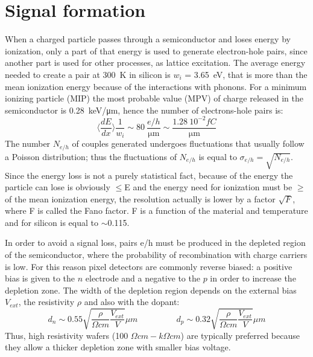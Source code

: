 \section{Signal formation}
   When a charged particle passes through a semiconductor and loses energy by ionization, only a part of that energy is used to generate electron-hole pairs, since another part is used for other processes, as lattice excitation.
   The average energy needed to create a pair at \SI{300}{K} in silicon is $w_i$ = \SI{3.65}{eV}, that is more than the mean ionization energy because of the interactions with phonons. For a minimum ionizing particle (MIP) the most probable value (MPV) of charge released in the semiconductor is \SI{0.28}{keV/\um}, hence the number of electrons-hole pairs is: 
   \begin{equation}
       \langle \frac{dE}{dx}\rangle \frac{1}{w_i} \sim 80 \: \frac{e/h}{\si{\um}} \sim \frac{1.28 \:10^{-2}\si{fC}}{\si{\um}}
   \end{equation}
   The number $N_{e/h}$ of couples generated undergoes fluctuations that usually follow a Poisson distribution;
   thus the fluctuations of $N_{e/h}$ is equal to  $\sigma_{e/h} =\sqrt{N_{e/h}}$. Since the energy loss is not a purely statistical fact, because of the energy the particle can lose is obviously $\leqslant$E and the energy need for ionization must be $\geqslant$ of the mean ionization energy, the resolution actually is lower by a factor $\sqrt{F}$, where F is called the Fano factor. F is a function of the material and temperature and for silicon is equal to $\sim$0.115.

   In order to avoid a signal loss, pairs e/h must be produced in the depleted region of the semiconductor, where the probability of recombination with charge carriers is low.
   For this reason pixel detectors are commonly reverse biased: a positive bias is given to the $n$ electrode and a negative to the $p$ in order to increase the depletion zone. 
   The width of the depletion region depends on the external bias $V_{ext}$, the resistivity $\rho$ and also with the dopant:
   \begin{equation}
      d_{n} \sim 0.55 \sqrt{\frac{\rho}{\Omega cm}\frac{V_{ext}}{V}} \mu m 
      \hspace{55pt}
      d_{p} \sim 0.32 \sqrt{\frac{\rho}{\Omega cm}\frac{V_{ext}}{V}} \mu m
      \label{eq:deplation_d}
   \end{equation}
   Thus, high resistivity wafers (100 $\Omega cm - k\Omega cm$) are typically preferred because they allow a thicker depletion zone with smaller bias voltage. 

